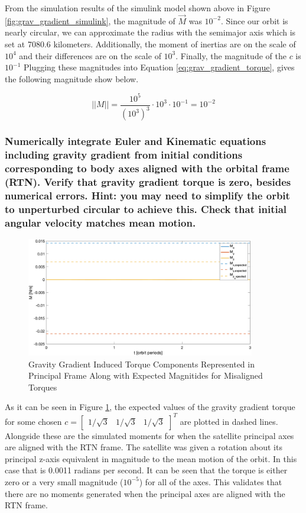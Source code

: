 From the simulation results of the simulink model shown above in Figure \ref{fig:grav_gradient_simulink}, the magnitude of $\Vec{M}$ was $10^{-2}$. Since our orbit is nearly circular, we can approximate the radius with the semimajor axis which is set at 7080.6 kilometers. Additionally, the moment of inertias are on the scale of $10^4$ and their differences are on the scale of $10^3$. Finally, the magnitude of the $c$ is $10^{-1}$ Plugging these magnitudes into Equation \ref{eq:grav_gradient_torque}, gives the following magnitude show below.

\begin{equation*}
    ||M|| = \frac{10^5}{(10^3)^3} \cdot 10^3 \cdot 10^{-1} = 10^{-2}
\end{equation*}

\subsubsection{Numerically integrate Euler and Kinematic equations including gravity gradient from initial conditions corresponding to body axes aligned with the orbital frame (RTN). Verify that gravity gradient torque is zero, besides numerical errors. Hint: you may need to simplify the orbit to unperturbed circular to achieve this. Check that initial angular velocity matches mean motion.}

\begin{figure}[H]
    \centering
    \captionsetup{ justification = centering}
    \includegraphics[width = 10cm]{Images/PS4/gravity_torque_RTN_aligned.png}
    \caption{Gravity Gradient Induced Torque Components Represented in Principal Frame Along with Expected Magnitides for Misaligned Torques}
    \label{fig:gravity_gradienet_RTN_aligned}
\end{figure}

As it can be seen in Figure \ref{fig:gravity_gradienet_RTN_aligned}, the expected values of the gravity gradient torque for some chosen $c = \begin{bmatrix} 1/\sqrt{3} & 1/\sqrt{3} & 1/\sqrt{3} \end{bmatrix}^T$ are plotted in dashed lines. Alongside these are the simulated moments for when the satellite principal axes are aligned with the RTN frame. The satellite was given a rotation about its principal z-axis equivalent in magnitude to the mean motion of the orbit. In this case that is 0.0011 radians per second. It can be seen that the torque is either zero or a very small magnitude ($10^{-5}$) for all of the axes. This validates that there are no moments generated when the principal axes are aligned with the RTN frame.


